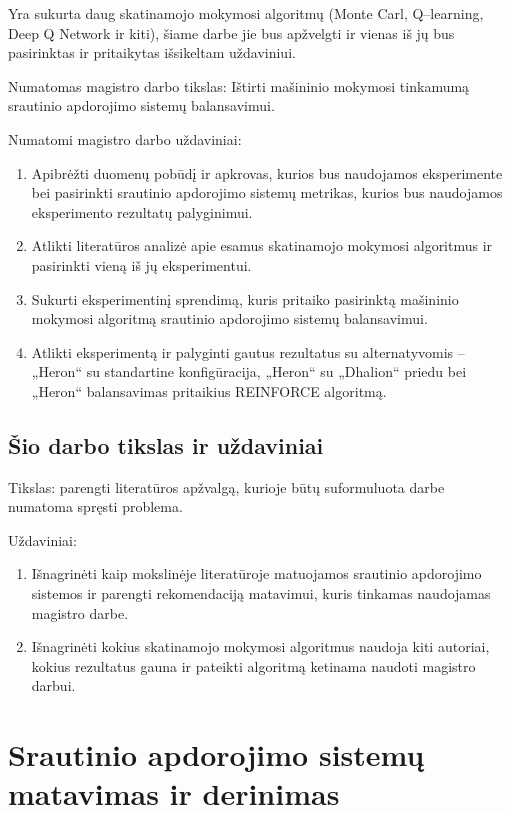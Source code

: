 \documentclass{VUMIFPSbakalaurinis}
\begin{document}
Yra sukurta daug skatinamojo mokymosi algoritmų (Monte Carl, Q–learning, Deep Q Network ir kiti), šiame darbe jie bus apžvelgti ir vienas iš jų bus pasirinktas ir pritaikytas išsikeltam uždaviniui. 

Numatomas magistro darbo tikslas: Ištirti mašininio mokymosi tinkamumą srautinio apdorojimo sistemų balansavimui. 

Numatomi magistro darbo uždaviniai:
\begin{enumerate}
    \item Apibrėžti duomenų pobūdį ir apkrovas, kurios bus naudojamos eksperimente bei pasirinkti srautinio apdorojimo sistemų metrikas, kurios bus naudojamos eksperimento rezultatų palyginimui.
    \item Atlikti literatūros analizė apie esamus skatinamojo mokymosi algoritmus ir pasirinkti vieną iš jų eksperimentui. 
    \item Sukurti eksperimentinį sprendimą, kuris pritaiko pasirinktą mašininio mokymosi algoritmą srautinio apdorojimo sistemų balansavimui.
    \item Atlikti eksperimentą ir palyginti gautus rezultatus su alternatyvomis – „Heron“ su standartine konfigūracija, „Heron“ su „Dhalion“ priedu bei „Heron“ balansavimas pritaikius REINFORCE algoritmą. 
\end{enumerate}


\subsection*{Šio darbo tikslas ir uždaviniai}
Tikslas: parengti literatūros apžvalgą, kurioje būtų suformuluota darbe numatoma spręsti problema.

Uždaviniai:
\begin{enumerate}
    \item Išnagrinėti kaip mokslinėje literatūroje matuojamos srautinio apdorojimo sistemos ir parengti rekomendaciją matavimui, kuris tinkamas naudojamas magistro darbe.
    \item Išnagrinėti kokius skatinamojo mokymosi algoritmus naudoja kiti autoriai, kokius rezultatus gauna ir pateikti algoritmą ketinama naudoti magistro darbui. 
\end{enumerate}

\section{Srautinio apdorojimo sistemų matavimas ir derinimas}
\end{document}
